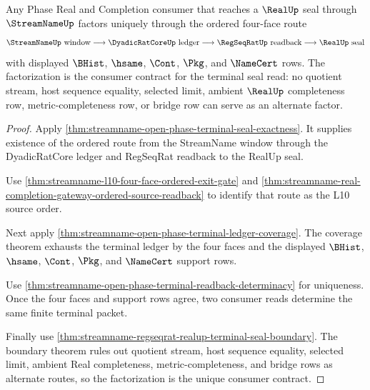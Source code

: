 \begin{theorem}
\label{thm:streamname-real-regseq-terminal-factorization}
Any Phase Real and Completion consumer that reaches a $\RealUp$ seal through $\StreamNameUp$ factors uniquely through the ordered four-face route
$$
\StreamNameUp\text{ window}\longrightarrow \DyadicRatCoreUp\text{ ledger}\longrightarrow \RegSeqRatUp\text{ readback}\longrightarrow \RealUp\text{ seal}
$$
with displayed $\BHist$, $\hsame$, $\Cont$, $\Pkg$, and $\NameCert$ rows. The factorization is the consumer contract for the terminal seal read: no quotient stream, host sequence equality, selected limit, ambient $\RealUp$ completeness row, metric-completeness row, or bridge row can serve as an alternate factor.
\end{theorem}
\begin{proof}
Apply \autoref{thm:streamname-open-phase-terminal-seal-exactness}. It supplies existence of the ordered route from the StreamName window through the DyadicRatCore ledger and RegSeqRat readback to the RealUp seal.

Use \autoref{thm:streamname-l10-four-face-ordered-exit-gate} and \autoref{thm:streamname-real-completion-gateway-ordered-source-readback} to identify that route as the L10 source order.

Next apply \autoref{thm:streamname-open-phase-terminal-ledger-coverage}. The coverage theorem exhausts the terminal ledger by the four faces and the displayed $\BHist$, $\hsame$, $\Cont$, $\Pkg$, and $\NameCert$ support rows.

Use \autoref{thm:streamname-open-phase-terminal-readback-determinacy} for uniqueness. Once the four faces and support rows agree, two consumer reads determine the same finite terminal packet.

Finally use \autoref{thm:streamname-regseqrat-realup-terminal-seal-boundary}. The boundary theorem rules out quotient stream, host sequence equality, selected limit, ambient Real completeness, metric-completeness, and bridge rows as alternate routes, so the factorization is the unique consumer contract.
\end{proof}

